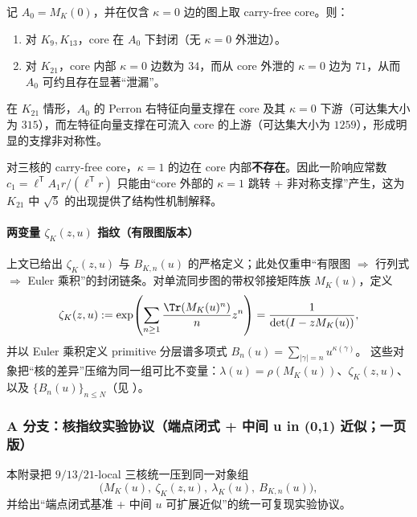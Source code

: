 \begin{proposition}\label{prop:carry-free-leakage}
记 $A_0=M_K(0)$，并在仅含 $\kappa=0$ 边的图上取 carry-free core。则：
\begin{enumerate}
  \item 对 $K_9,K_{13}$，core 在 $A_0$ 下封闭（无 $\kappa=0$ 外泄边）。
  \item 对 $K_{21}$，core 内部 $\kappa=0$ 边数为 $34$，而从 core 外泄的 $\kappa=0$ 边为 $71$，从而 $A_0$ 可约且存在显著“泄漏”。
\end{enumerate}
在 $K_{21}$ 情形，$A_0$ 的 Perron 右特征向量支撑在 core 及其 $\kappa=0$ 下游（可达集大小为 $315$），而左特征向量支撑在可流入 core 的上游（可达集大小为 $1259$），形成明显的支撑非对称性。
\end{proposition}

\begin{proposition}\label{prop:no-kappa1-in-core}
对三核的 carry-free core，$\kappa=1$ 的边在 core 内部\textbf{不存在}。因此一阶响应常数
\(
c_1=\ell^{\mathsf T}A_1r/(\ell^{\mathsf T}r)
\)
只能由“core 外部的 $\kappa=1$ 跳转 + 非对称支撑”产生，这为 $K_{21}$ 中 $\sqrt5$ 的出现提供了结构性机制解释。
\end{proposition}

\paragraph{两变量 \texorpdfstring{$\zeta_K(z,u)$}{zeta(z,u)} 指纹（有限图版本）}
上文已给出 $\zeta_K(z,u)$ 与 $B_{K,n}(u)$ 的严格定义；此处仅重申“有限图 $\Rightarrow$ 行列式 $\Rightarrow$ Euler 乘积”的封闭链条。对单流同步图的带权邻接矩阵族 $M_K(u)$，定义
\[
\zeta_K(z,u)
:=\exp\!\left(\sum_{n\ge 1}\frac{\Tr(M_K(u)^n)}{n}z^n\right)
=\frac{1}{\det(I-zM_K(u))},
\]
并以 Euler 乘积定义 primitive 分层谱多项式
\(
B_n(u)=\sum_{|\gamma|=n}u^{\kappa(\gamma)}
\)。
这些对象把“核的差异”压缩为同一组可比不变量：$\lambda(u)=\rho(M_K(u))$、$\zeta_K(z,u)$、以及 $\{B_n(u)\}_{n\le N}$（见 \cite{Ruelle1976ZetaExpanding,ParryPollicott1990Zeta,BrinStuck2002}）。

\subsubsection{A 分支：核指纹实验协议（端点闭式 + 中间 u in (0,1) 近似；一页版）}\label{app:kernel-fingerprint-protocol}
本附录把 $9/13/21$-local 三核统一压到同一对象组
\[
\bigl(M_K(u),\ \zeta_K(z,u),\ \lambda_K(u),\ B_{K,n}(u)\bigr),
\]
并给出“端点闭式基准 + 中间 $u$ 可扩展近似”的统一可复现实验协议。

